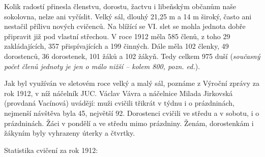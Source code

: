 Kolik radostí přinesla členstvu, dorostu, žactvu i libeňským občanům
naše sokolovna, nelze ani vyčíslit. Velký sál, dlouhý 21,25 m a 14 m
široký, často ani nestačil přílivu nových cvičenců. Na blížící se VI.
slet se mohla jednota dobře připravit již pod vlastní střechou. V roce
1912 měla 585 členů, z toho 29 zakládajících, 357 přispívajících a 199
činných. Dále měla 102 členky, 49 dorostenců, 36 dorostenek, 101 žáků a
102 žákyň. Tedy celkem 975 duší (\emph{současný počet členů jednoty je
jen o málo nižší -- kolem 800, pozn. ed.}).

Jak byl využíván ve sletovém roce velký a malý sál, poznáme z Výroční
zprávy za rok 1912, v níž náčelník JUC. Václav Vávra a náčelnice Milada
Jirkovská (provdaná Vacínová) uvádějí: muži cvičili třikrát v týdnu i o
prázdninách, nejmenší návštěva byla 45, největší 92. Dorostenci cvičili
ve středu a v sobotu, i o prázdninách. Žáci v pondělí a ve středu mimo
prázdniny. Ženám, dorostenkám i žákyním byly vyhrazeny úterky a čtvrtky.

Statistika cvičení za rok 1912:

